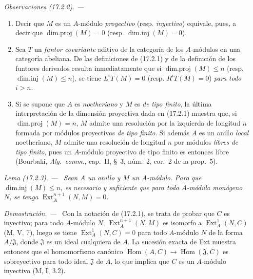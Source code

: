 \documentclass[10pt,oneside]{book}
\makeatletter
\newcommand{\setmanualcurrentlabel}[1]{\def\@currentlabel{#1}}
\newcommand{\oldpage}[2][]{%
  \setcounter{footnote}{0}%
  \marginpar{\scriptsize\textbf{#1}~|~#2}\ignorespaces}
\newenvironment{remarks}[1][]{%
  \setmanualcurrentlabel{#1}\par\medskip\noindent\itshape Observaciones (#1). ---\ }{\par}
\newenvironment{lemma}[1][]{%
  \setmanualcurrentlabel{#1}\par\medskip\noindent\itshape Lema (#1). ---\ }{\par}
\newenvironment{proof}{%
  \par\medskip\noindent\textit{Demostración. ---\ }}{\par}
\makeatother
\begin{document}
\begin{remarks}[17.2.2]
\label{0.17.2.2-es}
\begin{enumerate}
  \item[\rm (i)] Decir que $M$ es un $A$-módulo \emph{proyectivo} (resp.
  \emph{inyectivo}) equivale, pues, a decir que
  $\operatorname{dim.proj}(M)=0$ (resp. $\operatorname{dim.inj}(M)=0$).
  \item[\rm (ii)] Sea $T$ un \emph{funtor covariante} aditivo de la categoría
  de los $A$-módulos en una categoría abeliana. De las definiciones de
  (17.2.1) y de la definición de los
  \oldpage[0\textsubscript{IV-1}]{43}
  funtores derivados resulta inmediatamente que si $\operatorname{dim.proj}(M)\leq n$ (resp.
  $\operatorname{dim.inj}(M)\leq n$), se tiene $L^iT(M)=0$ (resp.
  $R^iT(M)=0$) \emph{para todo $i>n$}.
  \item[\rm (iii)] Si se supone que $A$ es \emph{noetheriano} y $M$ es \emph{de tipo
  finito}, la última interpretación de la dimensión proyectiva dada en
  (17.2.1) muestra que, si $\operatorname{dim.proj}(M)=n$, $M$ admite una
  resolución por la izquierda de longitud $n$ formada por módulos proyectivos \emph{de tipo
  finito}. Si además $A$ es un anillo \emph{local} noetheriano, $M$ admite una
  resolución de longitud $n$ por módulos \emph{libres de tipo finito}, pues un
  $A$-módulo proyectivo de tipo finito es entonces libre (Bourbaki,
  \emph{Alg.~comm.}, cap.~II, \S~3, núm.~2, cor.~2 de la prop.~5).
\end{enumerate}
\end{remarks}

\begin{lemma}[17.2.3]
\label{0.17.2.3-es}
Sean $A$ un anillo y $M$ un $A$-módulo. Para que
$\operatorname{dim.inj}(M)\leq n$, es necesario y suficiente que para todo
$A$-módulo \textup{monógeno} $N$, se tenga $\operatorname{Ext}^{n+1}_A(N,M)=0$.
\end{lemma}

\begin{proof}
Con la notación de (17.2.1), se trata de probar que $C$ es inyectivo;
para todo $A$-módulo $N$, $\operatorname{Ext}^{n+1}_A(N,M)$ es isomorfo a
$\operatorname{Ext}^1_A(N,C)$ (M, V, 7), luego se tiene
$\operatorname{Ext}^1_A(N,C)=0$ para todo $A$-módulo $N$ de la forma
$A/\mathfrak{J}$, donde $\mathfrak{J}$ es un ideal cualquiera de $A$. La sucesión
exacta de Ext muestra entonces que el homomorfismo canónico
$\operatorname{Hom}(A,C)\longrightarrow\operatorname{Hom}(\mathfrak{J},C)$ es
sobreyectivo para todo ideal $\mathfrak{J}$ de $A$, lo que implica que $C$ es un
$A$-módulo inyectivo (M, I, 3.2).
\end{proof}
\end{document}
